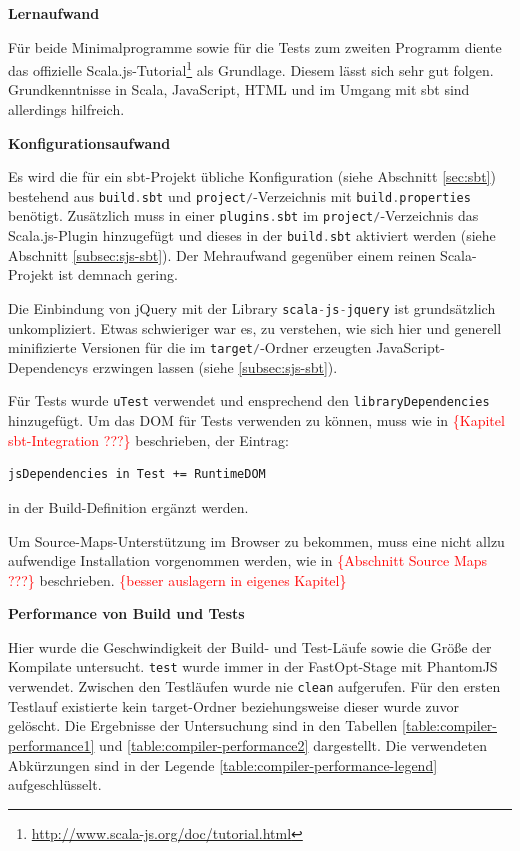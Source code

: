 \documentclass[a4paper, 12pt, hidelinks, listof=totoc, listoftables=totoc, bibliography=totoc]{scrreprt}
\newcommand{\code}[1]{\lstinline[language=Scala, style=inline]|#1|}
\newcommand{\TODOi}[1]{\textcolor{red}{\{#1\}}}
\newcommand{\MyMiniSec}[1]{\rmfamily\fontsize{12}{15}\selectfont
	\vspace{7pt}\textbf{#1} %
}
\begin{document}
\MyMiniSec{Lernaufwand}

Für beide Minimalprogramme sowie für die Tests zum zweiten Programm diente das offizielle Scala.js-Tutorial\footnote{\url{http://www.scala-js.org/doc/tutorial.html}} als Grundlage. Diesem lässt sich sehr gut folgen. Grundkenntnisse in Scala, JavaScript, \ac{HTML} und im Umgang mit sbt sind allerdings hilfreich.


\MyMiniSec{Konfigurationsaufwand}

Es wird die für ein sbt-Projekt übliche Konfiguration (siehe Abschnitt \ref{sec:sbt}) bestehend aus \code{build.sbt} und \code{project/}-Verzeichnis mit \code{build.properties} benötigt. Zusätzlich muss in einer \code{plugins.sbt} im \code{project/}-Verzeichnis das Scala.js-Plugin hinzugefügt und dieses in der \code{build.sbt} aktiviert werden (siehe Abschnitt \ref{subsec:sjs-sbt}). Der Mehraufwand gegenüber einem reinen Scala-Projekt ist demnach gering. 


Die Einbindung von jQuery mit der Library \code{scala-js-jquery} ist grundsätzlich unkompliziert. Etwas schwieriger war es, zu verstehen, wie sich hier und generell minifizierte Versionen für die im \code{target/}-Ordner erzeugten JavaScript-Dependencys erzwingen lassen (siehe \ref{subsec:sjs-sbt}).




Für Tests wurde \code{uTest} verwendet und ensprechend den \code{libraryDependencies} hinzugefügt. Um das \ac{DOM} für Tests verwenden zu können, muss wie in \TODOi{Kapitel sbt-Integration ???} beschrieben, der Eintrag:

\begin{lstlisting}[style=snippet]
jsDependencies in Test += RuntimeDOM
\end{lstlisting}
in der Build-Definition ergänzt werden.

Um Source-Maps-Unterstützung im Browser zu bekommen, muss eine nicht allzu aufwendige Installation vorgenommen werden, wie in \TODOi{Abschnitt Source Maps ???} beschrieben. \TODOi{besser auslagern in eigenes Kapitel}

\MyMiniSec{Performance von Build und Tests}

Hier wurde die Geschwindigkeit der Build- und Test-Läufe sowie die Größe der Kompilate untersucht. \code{test} wurde immer in der FastOpt-Stage mit PhantomJS verwendet. Zwischen den Testläufen wurde nie \code{clean} aufgerufen. Für den ersten Testlauf existierte kein target-Ordner beziehungsweise dieser wurde zuvor gelöscht. Die Ergebnisse der Untersuchung sind in den Tabellen \ref{table:compiler-performance1} und \ref{table:compiler-performance2} dargestellt. Die verwendeten Abkürzungen sind in der Legende \ref{table:compiler-performance-legend} aufgeschlüsselt.
\end{document}
